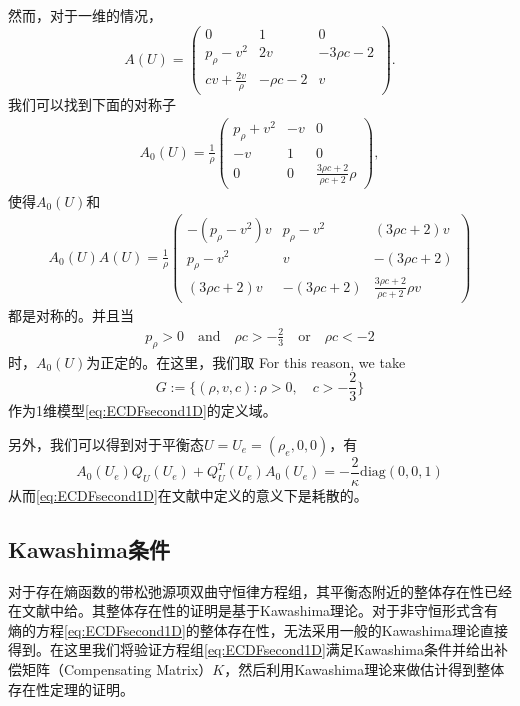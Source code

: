 然而，对于一维的情况，
\begin{equation*}
	A(U) = \left( \begin{array}{ccc}
		0 & 1 & 0 \\
		p_\rho - v^2 & 2v & -3 \rho c - 2 \\
		cv + \frac{2 v}{\rho} & -  \rho c - 2 & v 
	\end{array}\right).
\end{equation*}
我们可以找到下面的对称子
\begin{eqnarray}\label{31}
A_0(U) = \frac{1}{\rho} \left( \begin{array}{ccc}
	 p_\rho  +v^2 & -v & 0 \\ [2mm]
	-v & 1 & 0 \\[2mm]
	0 & 0 & \frac{3\rho c+2}{\rho c+2}\rho  \end{array} \right),
\end{eqnarray}
使得$A_0(U)$和
\begin{eqnarray*}
A_0(U) A(U) = \frac{1}{\rho} \left( \begin{array}{ccc}
		-(p_{\rho}-v^2)v & {p_\rho -v^2} & {(3\rho c + 2)v} \\[2mm]
		{p_\rho-v^2} & {v} & -{(3 \rho c+2)} \\[2mm]
		{(3 \rho c+ 2)v} & -{(3 \rho c+2)} & \frac{3\rho c+2}{\rho c + 2}\rho v
		\end{array} \right)
\end{eqnarray*}
都是对称的。并且当
\begin{eqnarray*}
p_\rho > 0 \quad \mbox{and} \quad \rho c > -\frac{2}{3} \quad \mbox{or} \quad  \rho c < -2 
\end{eqnarray*}
时，$A_0(U)$为正定的。在这里，我们取
For this reason, we take
\begin{equation}\label{37}
G := \{(\rho, v, c): \rho>0, \quad c> - \frac{2}{3}\}
\end{equation}
作为1维模型\eqref{eq:ECDFsecond1D}的定义域。

另外，我们可以得到对于平衡态$U=U_e = (\rho_e,0,0)$，有
\begin{equation}\label{32}
A_0(U_e)Q_U(U_e) + Q_U^T(U_e)A_0(U_e) =-\frac{2}{\kappa}\mbox{diag}(0, 0, 1)
\end{equation}
从而\eqref{eq:ECDFsecond1D}在文献\cite{yong1992singular,yong1999singular}中定义的意义下是耗散的。

\subsection{Kawashima条件}
对于存在熵函数的带松弛源项双曲守恒律方程组，其平衡态附近的整体存在性已经在文献\cite{yong2004entropy,hanouzet2003global}中给。其整体存在性的证明是基于Kawashima理论。对于非守恒形式含有熵的方程\eqref{eq:ECDFsecond1D}的整体存在性，无法采用一般的Kawashima理论直接得到。在这里我们将验证方程组\eqref{eq:ECDFsecond1D}满足Kawashima条件并给出补偿矩阵（Compensating Matrix）$K$\cite{kawashima1985systems}，然后利用Kawashima理论来做估计得到整体存在性定理的证明。

